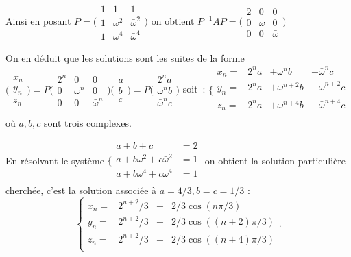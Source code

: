{{Ainsi en posant $P=\Big(\begin{smallmatrix}
  1&1&1\\1&\omega^{2}&\bar\omega^{2}\\1&\omega^{4}&\bar\omega^{4}\end{smallmatrix}\Big)$ on obtient
$P^{-1}AP=\Big(\begin{smallmatrix}
  2&0&0\\
  0&\omega&0\\
  0&0&\bar\omega\end{smallmatrix}\Big)$

On en déduit que les solutions sont les suites de la forme%
$\Big(\begin{smallmatrix}
  x_{n}\\
  y_{n}\\
  z_{n}  
\end{smallmatrix}\Big)=
P\Big(\begin{smallmatrix}
  2^n&0&0\\
  0&\omega^{n}&0\\
  0&0&\bar\omega^{n}\end{smallmatrix}\Big)
\Big(\begin{smallmatrix}
  a\\b\\c\end{smallmatrix}\Big)
=
P\Big(\begin{smallmatrix}2^na\\\omega^n b\\\bar\omega^nc\end{smallmatrix}\Big)
$ soit~:
$\Big\{\begin{smallmatrix}
  x_{n}=&2^na&+\omega^{n}b  &+\bar\omega^{n}c\\
  y_{n}=&2^na&+\omega^{n+2}b&+\bar\omega^{n+2}c\\
  z_{n}=&2^na&+\omega^{n+4}b&+\bar\omega^{n+4}c\\
\end{smallmatrix}$ où $a,b,c$ sont trois complexes.

En résolvant le système%
$\Big\{\begin{smallmatrix}
  a+b+c&=2\\
  a+b\omega^{2}+c\bar\omega^{2}&=1\\
  a+b\omega^{4}+c\bar\omega^{4}&=1\\
\end{smallmatrix}$
on obtient la solution particulière cherchée,  c'est la solution
associée à $a=4/3, b=c=1/3$ :
$$\left\{\begin{array}{llll}
  x_{n}=&2^{n+2}/3 &+&2/3 \cos(n\pi/3)\\
  y_{n}=&2^{n+2}/3 &+&2/3 \cos((n+2)\pi/3)\\
  z_{n}=&2^{n+2}/3 &+&2/3 \cos((n+4)\pi/3)\\
\end{array}\right..$$
}
}
